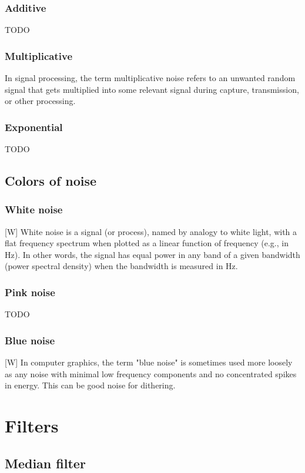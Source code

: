 \documentclass[12pt]{article}
\begin{document}
	\subsubsection{Additive}
	TODO
	\subsubsection{Multiplicative}
	In signal processing, the term multiplicative noise refers to an unwanted random signal that 
	gets multiplied into some relevant signal during capture, transmission, or other processing.
	\subsubsection{Exponential}
	TODO
	
	\subsection{Colors of noise}
	\subsubsection{White noise}
	[W] White noise is a signal (or process), named by analogy to white light, with a flat frequency
	spectrum when plotted as a linear function of frequency (e.g., in Hz). In other words, the signal 
	has equal power in any band of a given bandwidth (power spectral density) when the bandwidth is 
	measured in Hz. 
	\subsubsection{Pink noise}
	TODO
	\subsubsection{Blue noise}
	[W] In computer graphics, the term "blue noise" is sometimes used more loosely as any noise with 
	minimal low frequency components and no concentrated spikes in energy. This can be good noise for dithering.
%	
%	
\section{Filters}
	
	\subsection{Median filter}
\end{document}
